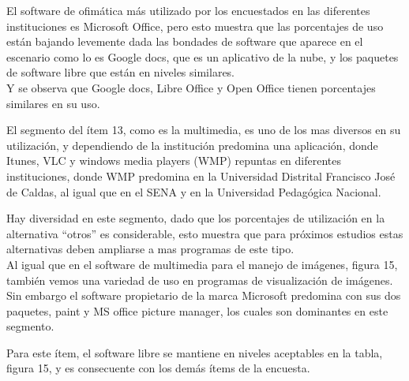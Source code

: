 \begin{multicols}{2}
El software de ofim\'atica m\'as utilizado por los encuestados en las diferentes instituciones es Microsoft Office, pero esto muestra que las porcentajes de uso están bajando levemente dada las bondades de software que aparece en el escenario como lo es Google docs, que es un aplicativo de la nube, y los paquetes de software libre que están en niveles similares. \\
Y se observa que Google docs, Libre Office y Open Office tienen porcentajes similares en su  uso.\\


El segmento del ítem 13, como es la multimedia, es uno de los mas diversos en su utilización, y dependiendo de la institución predomina una aplicación, donde Itunes, VLC  y windows media players (WMP) repuntas en diferentes instituciones, donde WMP predomina en la Universidad Distrital Francisco Jos\'e de Caldas, al igual que en el SENA y en la Universidad Pedag\'ogica Nacional.\\

\begin{center}
\end{center}

Hay diversidad en este segmento, dado que los porcentajes de utilización en la alternativa “otros” es considerable, esto muestra que para próximos estudios estas alternativas deben ampliarse a mas programas de este tipo.\\

Al igual que en el software de multimedia para el manejo de imágenes, figura 15,  tambi\'en vemos una variedad de uso en programas de visualizaci\'on de im\'agenes. Sin embargo el software propietario de la marca Microsoft predomina con sus dos paquetes, paint y MS office picture manager, los cuales son dominantes en este segmento.\\

\begin{center}
\end{center}

Para este ítem, el software libre se mantiene en niveles aceptables en la tabla, figura 15, y es consecuente con los demás ítems de la encuesta. \\


\end{multicols}
